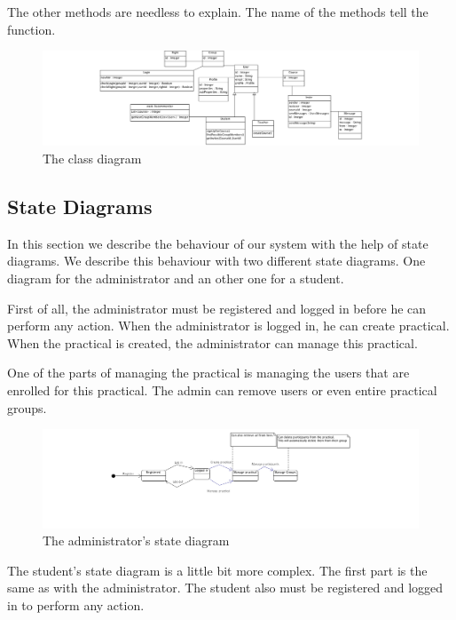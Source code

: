 The other methods are needless to explain.
The name of the methods tell the function.

\begin{figure}[H]
    \centering
    \captionsetup{justification=centering}
    \includegraphics[width=\textwidth, frame]{images/class_diagram}
    \caption{The class diagram}
    \label{class_diagram}
\end{figure}

\subsection{State Diagrams}
In this section we describe the behaviour of our system with the help of state diagrams.
We describe this behaviour with two different state diagrams.
One diagram for the administrator and an other one for a student.

First of all, the administrator must be registered and logged in before he can perform any action.
When the administrator is logged in, he can create practical.
When the practical is created, the administrator can manage this practical.

One of the parts of managing the practical is managing the users that are enrolled for this practical.
The admin can remove users or even entire practical groups.

\begin{figure}[H]
    \centering
    \captionsetup{justification=centering}
    \includegraphics[width=\textwidth, frame]{images/state_diagram_admin}
    \caption{The administrator's state diagram}
    \label{state_diagram_admin}
\end{figure}

The student's state diagram is a little bit more complex.
The first part is the same as with the administrator.
The student also must be registered and logged in to perform any action.

